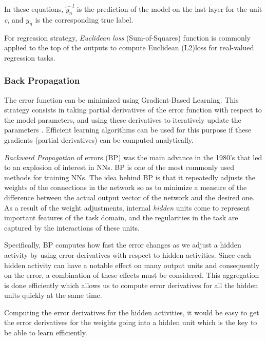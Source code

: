 In these equations, $\hat{y_n}^{l}$ is the prediction of the model on the last layer for the unit \textit{c}, and $y_n$  is the corresponding true label.

For regression strategy, \textit{Euclidean loss} (Sum-of-Squares) function is commonly applied to the top of the outputs to compute Euclidean (L2)loss for real-valued regression tasks.
 


\subsubsection{Back Propagation}
\label{subsec:bp}

The error function can be minimized using Gradient-Based Learning. This strategy consists in taking partial derivatives of the error function with respect to the model parameters, and using these derivatives to iteratively update the parameters \cite{lecun1998gradient}. Efficient learning algorithms can be used for this purpose if these gradients (partial derivatives) can be computed analytically.

\textit{Backward Propagation} of errors (BP) was the main advance in the 1980's that led to an explosion of interest in NNs. BP is one of the most commonly used methods for training NNs. The idea behind BP is that it repeatedly adjusts the weights of the connections in the network so as to minimize a measure of the difference between the actual output vector of the network and the desired one. As a result of the weight adjustments, internal \textit{hidden} units come to represent important features of the task domain, and the regularities in the task are captured by the interactions of these units\cite{williams1986learning}.

Specifically, BP computes how fast the error changes as we adjust a hidden activity by using error derivatives with respect to hidden activities. Since each hidden activity can have a notable effect on many output units and consequently on the error, a combination of these effects must be considered. This aggregation is done efficiently which allows us to compute error derivatives for all the hidden units quickly at the same time. 

\indent Computing the error derivatives for the hidden activities, it would be easy to get the error derivatives for the weights going into a hidden unit which is the key to be able to learn efficiently. 
%
%
